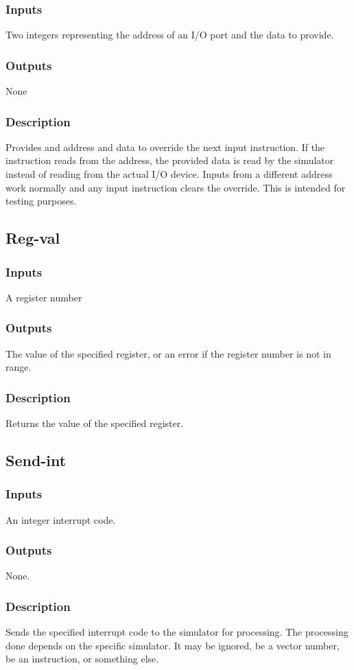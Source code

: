 \documentclass[10pt, openany]{book}
\begin{document}
\subsubsection{Inputs}
Two integers representing the address of an I/O port and the data to provide.
\subsubsection{Outputs}
None
\subsubsection{Description}
Provides and address and data to override the next input instruction.  If the instruction reads from the address, the provided data is read by the simulator instead of reading from the actual I/O device.  Inputs from a different address work normally and any input instruction clears the override.  This is intended for testing purposes.

\subsection{Reg-val}
\subsubsection{Inputs}
A register number
\subsubsection{Outputs}
The value of the specified register, or an error if the register number is not in range.
\subsubsection{Description}
Returns the value of the specified register.

\subsection{Send-int}
\subsubsection{Inputs}
An integer interrupt code.
\subsubsection{Outputs}
None.
\subsubsection{Description}
Sends the specified interrupt code to the simulator for processing.  The processing done depends on the specific simulator.  It may be ignored, be a vector number, be an instruction, or something else.
\end{document}
